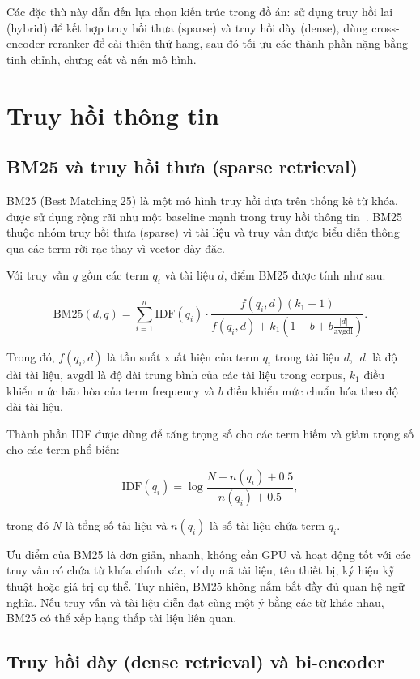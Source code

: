 \documentclass[../DoAn.tex]{subfiles}
\begin{document}
Các đặc thù này dẫn đến lựa chọn kiến trúc trong đồ án: sử dụng truy hồi lai (hybrid) để kết hợp truy hồi thưa (sparse) và truy hồi dày (dense), dùng cross-encoder reranker để cải thiện thứ hạng, sau đó tối ưu các thành phần nặng bằng tinh chỉnh, chưng cất và nén mô hình.

\section{Truy hồi thông tin}
\label{section:2.2}

\subsection{BM25 và truy hồi thưa (sparse retrieval)}
\label{subsection:2.2.1}

BM25 (Best Matching 25) là một mô hình truy hồi dựa trên thống kê từ khóa, được sử dụng rộng rãi như một baseline mạnh trong truy hồi thông tin~\cite{robertson2009bm25}. BM25 thuộc nhóm truy hồi thưa (sparse) vì tài liệu và truy vấn được biểu diễn thông qua các term rời rạc thay vì vector dày đặc.

Với truy vấn $q$ gồm các term $q_i$ và tài liệu $d$, điểm BM25 được tính như sau:

\[
\mathrm{BM25}(d,q)
=
\sum_{i=1}^{n}
\mathrm{IDF}(q_i)
\cdot
\frac{
f(q_i,d)(k_1+1)
}{
f(q_i,d)
+
k_1
\left(
1-b+b\frac{|d|}{\mathrm{avgdl}}
\right)
}.
\]

Trong đó, $f(q_i,d)$ là tần suất xuất hiện của term $q_i$ trong tài liệu $d$, $|d|$ là độ dài tài liệu, $\mathrm{avgdl}$ là độ dài trung bình của các tài liệu trong corpus, $k_1$ điều khiển mức bão hòa của term frequency và $b$ điều khiển mức chuẩn hóa theo độ dài tài liệu.

Thành phần IDF được dùng để tăng trọng số cho các term hiếm và giảm trọng số cho các term phổ biến:

\[
\mathrm{IDF}(q_i)
=
\log
\frac{
N-n(q_i)+0.5
}{
n(q_i)+0.5
},
\]

trong đó $N$ là tổng số tài liệu và $n(q_i)$ là số tài liệu chứa term $q_i$.

Ưu điểm của BM25 là đơn giản, nhanh, không cần GPU và hoạt động tốt với các truy vấn có chứa từ khóa chính xác, ví dụ mã tài liệu, tên thiết bị, ký hiệu kỹ thuật hoặc giá trị cụ thể. Tuy nhiên, BM25 không nắm bắt đầy đủ quan hệ ngữ nghĩa. Nếu truy vấn và tài liệu diễn đạt cùng một ý bằng các từ khác nhau, BM25 có thể xếp hạng thấp tài liệu liên quan.

\subsection{Truy hồi dày (dense retrieval) và bi-encoder}
\label{subsection:2.2.2}
\end{document}
